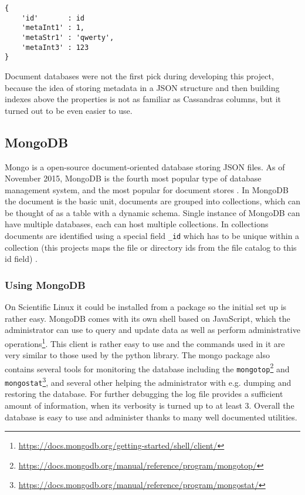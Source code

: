 \begin{verbatim}
{
	'id'       : id
	'metaInt1' : 1,
	'metaStr1' : 'qwerty',
	'metaInt3' : 123
}
\end{verbatim}


Document databases were not the first pick during developing this project, because the idea of
storing metadata in a JSON structure and then building indexes above the properties is not as
familiar as Cassandras columns, but it turned out to be even easier to use.

\subsection{MongoDB}

Mongo is a open-source document-oriented database storing JSON files. As of November 2015, MongoDB is the fourth 
most popular type of database management system, and the most popular for document stores \cite{MongoPop}. 
In MongoDB the document is the basic unit, documents are grouped into collections, which can be thought of as 
a table with a dynamic schema. Single instance of MongoDB can have multiple databases, each can host multiple 
collections. In collections documents are identified using a special field \texttt{\_id} which has to be unique
within a collection\cite{MongoBook} (this projects maps the file or directory ids from the file catalog 
to this id field) .

\subsubsection{Using MongoDB}

On Scientific Linux it could be installed from a package so the initial set up is rather easy.
MongoDB comes with its own shell based on
JavaScript, which the administrator can use to query and update data as well as perform administrative 
operations\footnote{\url{https://docs.mongodb.org/getting-started/shell/client/}}. This client is rather easy to
use and the commands used in it are very similar to those used by the python library. The mongo
package also contains several tools for monitoring the database
including the \texttt{mongotop}\footnote{\url{https://docs.mongodb.org/manual/reference/program/mongotop/}} 
and \texttt{mongostat}\footnote{\url{https://docs.mongodb.org/manual/reference/program/mongostat/}}, and several 
other helping the administrator with e.g. dumping and restoring the database. For further 
debugging the log file provides a sufficient amount of information, when its verbosity is turned up to at least 3.
Overall the database is easy to use and administer thanks to many well documented utilities. 

